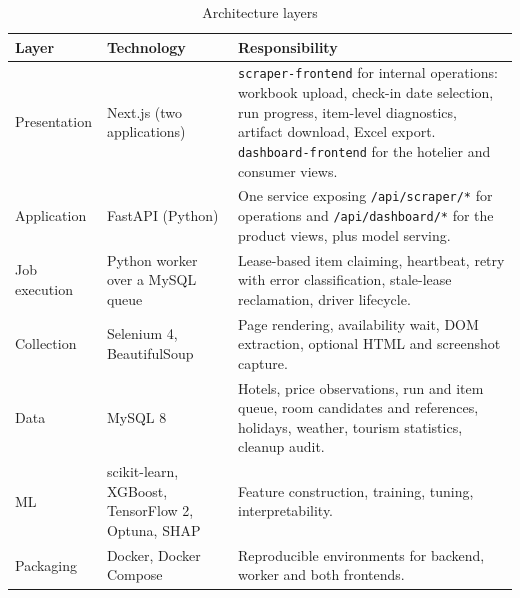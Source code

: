 \begin{table}[!htbp]
\centering
\caption{Architecture layers}
\label{tab:architecture}
\begin{tabular}{|p{2.6cm}|p{4.0cm}|p{7.0cm}|}
\hline
\textbf{Layer} & \textbf{Technology} & \textbf{Responsibility} \\
\hline
Presentation & Next.js (two applications) & \texttt{scraper-frontend} for internal operations: workbook upload, check-in date selection, run progress, item-level diagnostics, artifact download, Excel export. \texttt{dashboard-frontend} for the hotelier and consumer views. \\
\hline
Application & FastAPI (Python) & One service exposing \texttt{/api/scraper/*} for operations and \texttt{/api/dashboard/*} for the product views, plus model serving. \\
\hline
Job execution & Python worker over a MySQL queue & Lease-based item claiming, heartbeat, retry with error classification, stale-lease reclamation, driver lifecycle. \\
\hline
Collection & Selenium 4, BeautifulSoup & Page rendering, availability wait, DOM extraction, optional HTML and screenshot capture. \\
\hline
Data & MySQL 8 & Hotels, price observations, run and item queue, room candidates and references, holidays, weather, tourism statistics, cleanup audit. \\
\hline
ML & scikit-learn, XGBoost, TensorFlow 2, Optuna, SHAP & Feature construction, training, tuning, interpretability. \\
\hline
Packaging & Docker, Docker Compose & Reproducible environments for backend, worker and both frontends. \\
\hline
\end{tabular}
\end{table}

